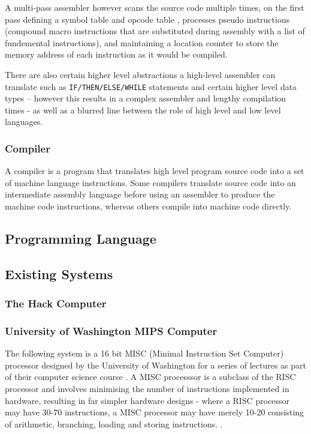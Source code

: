 A multi-pass assembler however scans the source code multiple times, on the first pass defining a symbol table and opcode table \cite{TOPPR-assembler}, processes pseudo instructions (compound macro instructions that are substituted during assembly with a list of fundemental instructions), and maintaining a location counter to store the memory address of each instruction as it would be compiled.

There are also certain higher level abstractions a high-level assembler can translate such as \texttt{IF/THEN/ELSE/WHILE} statements and certain higher level data types – however this results in a complex assembler and lengthy compilation times - as well as a blurred line between the role of high level and low level languages. 

\subsubsection{Compiler}
\label{sec:Compiler}
A compiler is a program that translates high level program source code into a set of machine language instructions. Some compilers translate source code into an intermediate assembly language before using an assembler to produce the machine code instructions, whereas others compile into machine code directly.

\subsection{Programming Language}
\subsection{Existing Systems}
\subsubsection{The Hack Computer}
\subsubsection{University of Washington MIPS Computer}
The following system is a 16 bit MISC (Minimal Instruction Set Computer) processor designed by the University of Washington for a series of lectures as part of their computer science course \textcite{MIPS-uw}. A MISC processsor is a subclass of the RISC processor and involves minimising the number of instructions implemented in hardware, resulting in far simpler hardware designs - where a RISC processor may have 30-70 instructions, a MISC processor may have merely 10-20 consisting of arithmetic, branching, loading and storing instructions. \textcite{MISC-dakeng}. 

